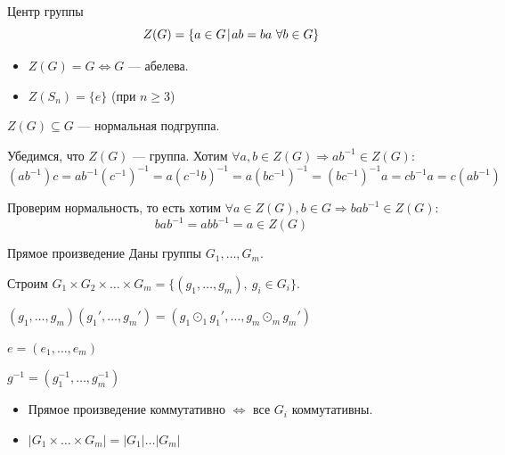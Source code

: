 \begin{defn}{Центр группы}{}
    \[
        Z(G) = \{ a \in G \: \vline \: ab = ba \ \forall b \in G \}
    \]
\end{defn}

\begin{example}{}{}
    \begin{itemize}
        \item
            \( Z(G) = G \Leftrightarrow G \) --- абелева.
        \item
            \( Z(S_n) = \{ e \} \) (при \( n \geq 3 \))
    \end{itemize}
\end{example}

\begin{prop}{}{}
    \( Z(G) \subseteq G \) --- нормальная подгруппа.
\end{prop}

Убедимся, что \( Z(G) \) --- группа.
Хотим \( \forall a, b \in Z(G) \Rightarrow a b^{-1} \in Z(G) \):
\[
    (a b^{-1}) c
    =
    a b^{-1} (c^{-1})^{-1}
    =
    a (c^{-1} b)^{-1}
    =
    a (b c^{-1})^{-1}
    =
    (b c^{-1})^{-1} a
    =
    c b^{-1} a
    =
    c (a b^{-1})
\]

Проверим нормальность, то есть хотим \( \forall a \in Z(G), b \in G \Rightarrow b a b^{-1} \in Z(G) \):
\[
    b a b^{-1} = a b b^{-1} = a \in Z(G)
\]

\begin{defn}{Прямое произведение}{}
    Даны группы \( G_1, \ldots, G_m \).

    Строим \( G_1 \times G_2 \times \ldots \times G_m = \{ (g_1, \ldots, g_m), \: g_i \in G_i \} \).

    \( (g_1, \ldots, g_m) (g_1', \ldots, g_m') = (g_1 \odot_1 g_1', \ldots, g_m \odot_m g_m') \)

    \( e = (e_1, \ldots, e_m) \)

    \( g^{-1} = (g_1^{-1}, \ldots, g_m^{-1}) \)
\end{defn}

\begin{remark}{}{}
    \begin{itemize}
        \item
            Прямое произведение коммутативно \( \Leftrightarrow \) все \( G_i \) коммутативны.
        \item
            \( |G_1 \times \ldots \times G_m| = |G_1| \ldots |G_m| \)
    \end{itemize}
\end{remark}

